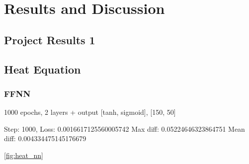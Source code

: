 \section{Results and Discussion}\label{sec:Results}

\subsection{Project Results 1}\label{sec:project results}

\subsection{Heat Equation}\label{sec:heateq results}



\subsubsection{FFNN}
1000 epochs, 2 layers + output [tanh, sigmoid], [150, 50]

Step: 1000, Loss: 0.0016617125560005742
Max diff: 0.05224646323864751
Mean diff: 0.004334475145176679

\autoref{fig:heat_nn} 

